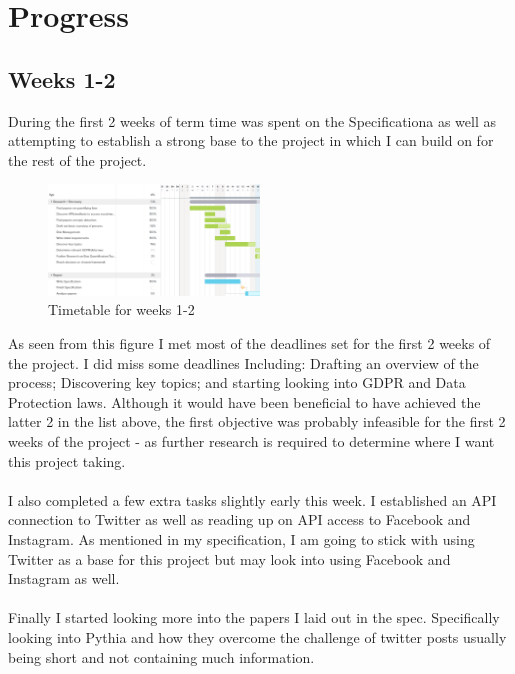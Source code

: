 \section{Progress}
\label{sec:progress}
\subsection{Weeks 1-2}
During the first 2 weeks of term time was spent on the Specificationa as well as attempting to establish a strong
base to the project in which I can build on for the rest of the project.

\begin{figure}[htbp]
    \centering
    \includegraphics[width=0.5\textwidth]{../images/timetableweek1-2.png}
    \caption{Timetable for weeks 1-2}
    \label{fig:timetableweek1-2}
\end{figure}

As seen from this figure I met most of the deadlines set for the first 2 weeks of the project. I did miss some deadlines
Including: Drafting an overview of the process; Discovering key topics; and starting looking into GDPR and Data Protection laws.
Although it would have been beneficial to have achieved the latter 2 in the list above, the first objective was probably infeasible
for the first 2 weeks of the project - as further research is required to determine where I want this project taking.\\\\

I also completed a few extra tasks slightly early this week. I established an API connection to Twitter as well as reading up on
API access to Facebook and Instagram. As mentioned in my specification, I am going to stick with using Twitter as a base for
this project but may look into using Facebook and Instagram as well.\\\\

Finally I started looking more into the papers I laid out in the spec. Specifically looking into Pythia and how they overcome
the challenge of twitter posts usually being short and not containing much information.


